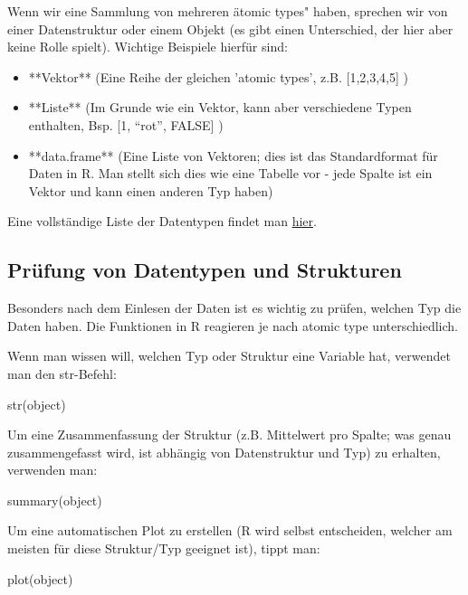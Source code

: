 \documentclass[a4paper,twoside]{tufte-book}\usepackage[]{graphicx}\usepackage[]{color}
\begin{document}
\begin{appendices}
Wenn wir eine Sammlung von mehreren ätomic types" haben, sprechen wir von einer Datenstruktur oder einem Objekt (es gibt einen Unterschied, der hier aber keine Rolle spielt). Wichtige Beispiele hierfür sind:

  \begin{itemize}
		\item **Vektor** (Eine Reihe der gleichen 'atomic types', z.B. [1,2,3,4,5] )
		\item **Liste** (Im Grunde wie ein Vektor, kann aber verschiedene Typen enthalten, Bsp. [1, "`rot"', FALSE] )
		\item **data.frame** (Eine Liste von Vektoren; dies ist das Standardformat für Daten in R. Man stellt sich dies wie eine Tabelle vor - jede Spalte ist ein Vektor und kann einen anderen Typ haben)
	\end{itemize}

Eine vollständige Liste der Datentypen findet man \href{http://www.statmethods.net/input/datatypes.html}{hier}. 
 
\subsection{Prüfung von Datentypen und Strukturen}

Besonders nach dem Einlesen der Daten ist es wichtig zu prüfen, welchen Typ die Daten haben. Die Funktionen in R reagieren je nach atomic type unterschiedlich.

Wenn man wissen will, welchen Typ oder Struktur eine Variable hat, verwendet man den str-Befehl:

\begin{Schunk}
\begin{Sinput}
str(object)
\end{Sinput}
\end{Schunk}

Um eine Zusammenfassung der Struktur (z.B. Mittelwert pro Spalte; was genau zusammengefasst wird, ist abhängig von Datenstruktur und Typ) zu erhalten, verwenden man:

\begin{Schunk}
\begin{Sinput}
summary(object)
\end{Sinput}
\end{Schunk}


Um eine automatischen Plot zu erstellen (R wird selbst entscheiden, welcher am meisten für diese Struktur/Typ geeignet ist), tippt man:

\begin{Schunk}
\begin{Sinput}
plot(object)
\end{Sinput}
\end{Schunk}


\end{appendices}
\end{document}
